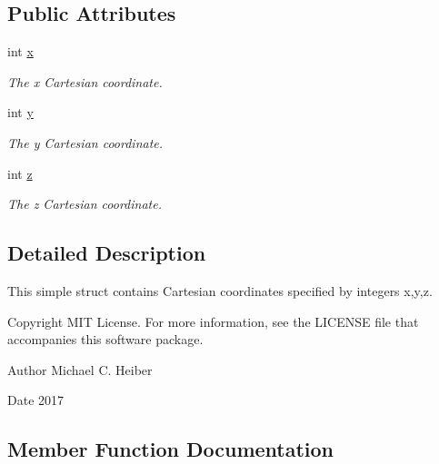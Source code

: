 \subsection*{Public Attributes}
\begin{DoxyCompactItemize}
\item 
\mbox{\label{struct_coords_a59992d986e76375f31828d32c05cd15d}} 
int \hyperlink{struct_coords_a59992d986e76375f31828d32c05cd15d}{x}
\begin{DoxyCompactList}\small\item\em The x Cartesian coordinate. \end{DoxyCompactList}\item 
\mbox{\label{struct_coords_a7ed64d02fb7550f1506a93fcfab7f16f}} 
int \hyperlink{struct_coords_a7ed64d02fb7550f1506a93fcfab7f16f}{y}
\begin{DoxyCompactList}\small\item\em The y Cartesian coordinate. \end{DoxyCompactList}\item 
\mbox{\label{struct_coords_a96d176173dbd5d97e7af63e1b5c0f7e1}} 
int \hyperlink{struct_coords_a96d176173dbd5d97e7af63e1b5c0f7e1}{z}
\begin{DoxyCompactList}\small\item\em The z Cartesian coordinate. \end{DoxyCompactList}\end{DoxyCompactItemize}


\subsection{Detailed Description}
This simple struct contains Cartesian coordinates specified by integers x,y,z. 

\begin{DoxyCopyright}{Copyright}
M\+IT License. For more information, see the L\+I\+C\+E\+N\+SE file that accompanies this software package. 
\end{DoxyCopyright}
\begin{DoxyAuthor}{Author}
Michael C. Heiber 
\end{DoxyAuthor}
\begin{DoxyDate}{Date}
2017 
\end{DoxyDate}


\subsection{Member Function Documentation}
\mbox{\label{struct_coords_aaea2c566feec4e4bf56b27a34568be76}} 
